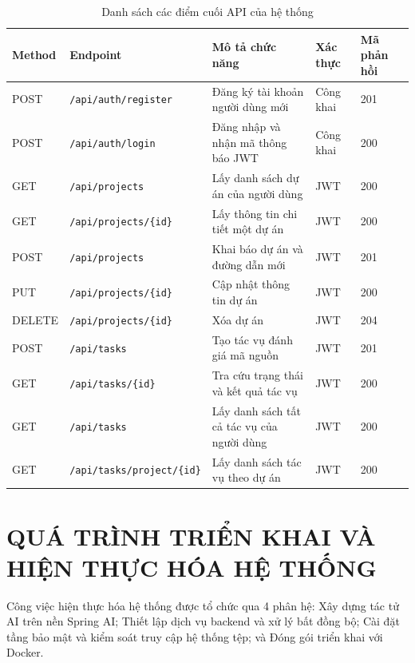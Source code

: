 \documentclass[12pt,a4paper]{report}
\begin{document}
\begin{table}[H]
\centering
\caption{Danh sách các điểm cuối API của hệ thống}
\label{tab:api_endpoints}
\renewcommand{\arraystretch}{1.2}
\begin{tabular}{|l|l|p{4.8cm}|l|l|}
\hline
\textbf{Method} & \textbf{Endpoint} & \textbf{Mô tả chức năng} & \textbf{Xác thực} & \textbf{Mã phản hồi} \\ \hline
POST & \texttt{/api/auth/register} & Đăng ký tài khoản người dùng mới & Công khai & 201 \\ \hline
POST & \texttt{/api/auth/login} & Đăng nhập và nhận mã thông báo JWT & Công khai & 200 \\ \hline
GET & \texttt{/api/projects} & Lấy danh sách dự án của người dùng & JWT & 200 \\ \hline
GET & \texttt{/api/projects/\{id\}} & Lấy thông tin chi tiết một dự án & JWT & 200 \\ \hline
POST & \texttt{/api/projects} & Khai báo dự án và đường dẫn mới & JWT & 201 \\ \hline
PUT & \texttt{/api/projects/\{id\}} & Cập nhật thông tin dự án & JWT & 200 \\ \hline
DELETE & \texttt{/api/projects/\{id\}} & Xóa dự án & JWT & 204 \\ \hline
POST & \texttt{/api/tasks} & Tạo tác vụ đánh giá mã nguồn & JWT & 201 \\ \hline
GET & \texttt{/api/tasks/\{id\}} & Tra cứu trạng thái và kết quả tác vụ & JWT & 200 \\ \hline
GET & \texttt{/api/tasks} & Lấy danh sách tất cả tác vụ của người dùng & JWT & 200 \\ \hline
GET & \texttt{/api/tasks/project/\{id\}} & Lấy danh sách tác vụ theo dự án & JWT & 200 \\ \hline
\end{tabular}
\end{table}

\chapter{QUÁ TRÌNH TRIỂN KHAI VÀ HIỆN THỰC HÓA HỆ THỐNG}

Công việc hiện thực hóa hệ thống được tổ chức qua 4 phân hệ: Xây dựng tác tử AI trên nền Spring AI; Thiết lập dịch vụ backend và xử lý bất đồng bộ; Cài đặt tầng bảo mật và kiểm soát truy cập hệ thống tệp; và Đóng gói triển khai với Docker.
\end{document}
